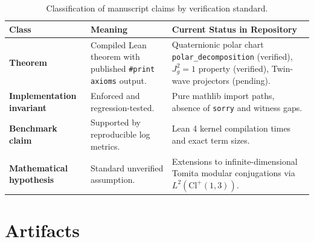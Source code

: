 \documentclass{article}
\begin{document}
\begin{table}[h]
\centering
\begin{tabular}{llp{7cm}}
\toprule
\textbf{Class} & \textbf{Meaning} & \textbf{Current Status in Repository} \\
\midrule
\textbf{Theorem} & Compiled Lean theorem with published \texttt{\#print axioms} output. & Quaternionic polar chart \texttt{polar\_decomposition} (verified), $J_g^2 = 1$ property (verified), Twin-wave projectors (pending). \\
\textbf{Implementation invariant} & Enforced and regression-tested. & Pure mathlib import paths, absence of \texttt{sorry} and witness gaps. \\
\textbf{Benchmark claim} & Supported by reproducible log metrics. & Lean 4 kernel compilation times and exact term sizes. \\
\textbf{Mathematical hypothesis} & Standard unverified assumption. & Extensions to infinite-dimensional Tomita modular conjugations via $L^2(\mathrm{Cl}^+(1,3))$. \\
\bottomrule
\end{tabular}
\caption{Classification of manuscript claims by verification standard.}
\label{tab:claim_hierarchy}
\end{table}













\appendix
\section{Artifacts}



\end{document}

